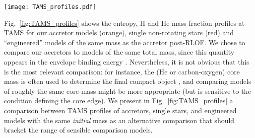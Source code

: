 \documentclass[twocolumn,twocolappendix,trackchanges]{aastex63}
\DeclareRobustCommand{\Eqref}[1]{Eq.~\ref{#1}}
\DeclareRobustCommand{\Figref}[1]{Fig.~\ref{#1}}
\begin{document}
\begin{figure*}[htbp]
  \centering
  \texttt{[image: TAMS\_profiles.pdf]}
  \caption{Specific entropy (top row), H (bottom row, solid lines),
    and He (bottom row, dashed lines) TAMS profiles for non-rotating single
    stars (red), accretors (orange), and ``engineered'' models of the
    same total mass as the post-RLOF mass of the accretors. The gray
    bands emphasize the CEB region, which is well
    defined at TAMS.}
  \label{fig:TAMS_profiles}
\end{figure*}

\Figref{fig:TAMS_profiles} shows the entropy, H and He mass fraction
profiles at TAMS for our accretor models (orange), single non-rotating
stars (red) and ``engineered'' models of the same mass as the accretor
post-RLOF. We chose to compare our accretors to models of the same
total mass, since this quantity appears in the envelope binding energy
\citep[see \Eqref{eq:BE} and e.g.,][]{dekool:1990, dewi:2000}.
Nevertheless, it is not obvious that this is the most relevant
comparison: for instance, the (He or carbon-oxygen) core mass is often
used to determine the final compact object \citep[e.g.,][]{fryer:2012,
  farmer:2019, patton:2021, renzo:2022, fryer:2022}, and comparing models of roughly the same
core-mass might be more appropriate (but is sensitive to the condition
defining the core edge). We present in
\Figref{fig:TAMS_profiles} a comparison between TAMS
profiles of accretors, single stars, and engineered models with the
same \emph{initial} mass as an alternative comparison that should bracket the
range of sensible comparison models.
\end{document}
